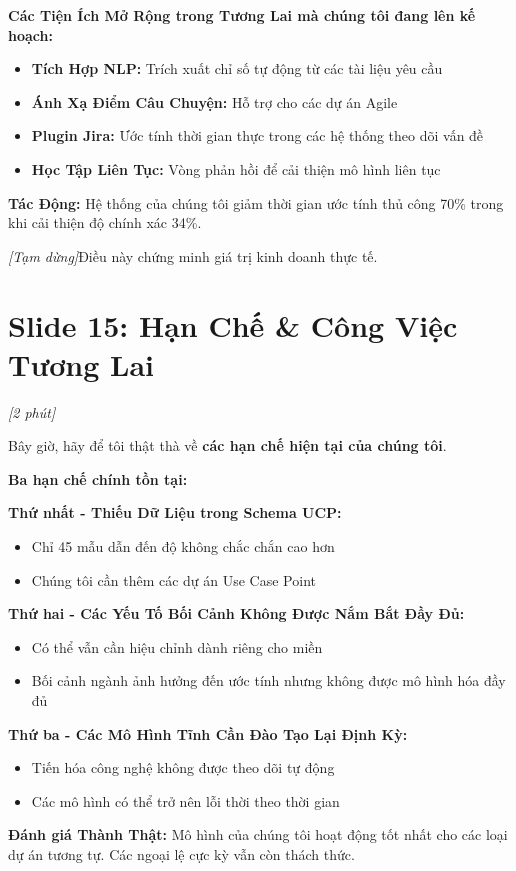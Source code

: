\documentclass[12pt,a4paper]{article}
\newcommand{\slide}[1]{\section*{\textcolor{slidenum}{Slide #1}}}
\newcommand{\timing}[1]{\textcolor{timing}{\textit{[#1]}}}
\newcommand{\keypoint}[1]{\textcolor{keypoint}{\textbf{#1}}}
\newcommand{\pause}{\textit{[Tạm dừng]}}
\begin{document}
\textbf{Các Tiện Ích Mở Rộng trong Tương Lai mà chúng tôi đang lên kế hoạch:}
\begin{itemize}
    \item \textbf{Tích Hợp NLP:} Trích xuất chỉ số tự động từ các tài liệu yêu cầu
    \item \textbf{Ánh Xạ Điểm Câu Chuyện:} Hỗ trợ cho các dự án Agile
    \item \textbf{Plugin Jira:} Ước tính thời gian thực trong các hệ thống theo dõi vấn đề
    \item \textbf{Học Tập Liên Tục:} Vòng phản hồi để cải thiện mô hình liên tục
\end{itemize}

\textbf{Tác Động:} Hệ thống của chúng tôi giảm thời gian ước tính thủ công 70\% trong khi cải thiện độ chính xác 34\%.

\pause Điều này chứng minh giá trị kinh doanh thực tế.

\slide{15: Hạn Chế \& Công Việc Tương Lai}
\timing{2 phút}

Bây giờ, hãy để tôi thật thà về \keypoint{các hạn chế hiện tại của chúng tôi}.

\textbf{Ba hạn chế chính tồn tại:}

\textbf{Thứ nhất - Thiếu Dữ Liệu trong Schema UCP:}
\begin{itemize}
    \item Chỉ 45 mẫu dẫn đến độ không chắc chắn cao hơn
    \item Chúng tôi cần thêm các dự án Use Case Point
\end{itemize}

\textbf{Thứ hai - Các Yếu Tố Bối Cảnh Không Được Nắm Bắt Đầy Đủ:}
\begin{itemize}
    \item Có thể vẫn cần hiệu chỉnh dành riêng cho miền
    \item Bối cảnh ngành ảnh hưởng đến ước tính nhưng không được mô hình hóa đầy đủ
\end{itemize}

\textbf{Thứ ba - Các Mô Hình Tĩnh Cần Đào Tạo Lại Định Kỳ:}
\begin{itemize}
    \item Tiến hóa công nghệ không được theo dõi tự động
    \item Các mô hình có thể trở nên lỗi thời theo thời gian
\end{itemize}

\textbf{Đánh giá Thành Thật:} Mô hình của chúng tôi hoạt động tốt nhất cho các loại dự án tương tự. Các ngoại lệ cực kỳ vẫn còn thách thức.
\end{document}
